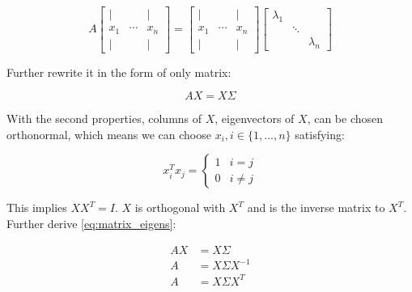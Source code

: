 \documentclass[a4paper]{book}
\begin{document}
      \begin{displaymath}
        A
        \begin{bmatrix}
           |    &         &   |   \\
          x_{1} & \cdots  & x_{n} \\
           |    &         &   |   
        \end{bmatrix}
        =
        \begin{bmatrix}
           |    &         &   |   \\
          x_{1} & \cdots & x_{n} \\
           |    &         &   |   
        \end{bmatrix}
        \begin{bmatrix}
          \lambda_{1} &         &             \\
                      & \ddots  &             \\
                      &         & \lambda_{n} 
        \end{bmatrix}
      \end{displaymath}

      Further rewrite it in the form of only matrix:

      \begin{equation}
        AX = X\Sigma
        \label{eq:matrix_eigens}
      \end{equation}

      With the second properties, columns of $X$, eigenvectors of $X$,
      can be chosen orthonormal, which means we can choose $x_{i}, i \in
      \{1, ..., n\}$ satisfying:

      \begin{displaymath}
        x_{i}^{T}x_{j} = 
        \begin{cases}
          1  & i = j\\
          0  & i \neq j
        \end{cases}
      \end{displaymath}

      This implies $XX^{T} = I$. $X$ is orthogonal with $X^{T}$ and is
      the inverse matrix to $X^{T}$. Further derive
      \ref{eq:matrix_eigens}:

      \begin{align*}
        AX & = X\Sigma\\
        A  & = X\Sigma X^{-1}\\
        A  & = X\Sigma X^{T}
      \end{align*}
\end{document}
